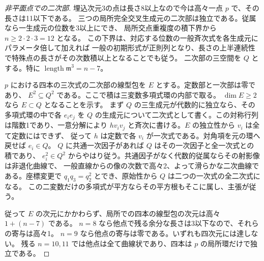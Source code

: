 \begin{proof}[非平面点での二次部]
埋込次元3の点は長さ8以上なので今は高々一点 $p$ で、その長さは11以下である。
三つの局所完全交叉生成元の二次部は独立である。従属なら一生成元の位数を3以上にでき、
局所交点重複度の積下界から $n\ge2\cdot2\cdot3=12$ となる。
この下界は、対応する位数の一般斉次式を各生成元にパラメータ倍して加えれば
一般の初期形式が正則列となり、長さの上半連続性で特殊点の長さがその次数積以上となることでも従う。
二次部の三空間を $Q$ とする。特に $\operatorname{length}\mathfrak m^3=n-7$。

$p$ における四本の三次式の二次部の線型包を $E$ とする。定数部と一次部は零であり、
$E^2\subseteq Q^2$ である。ここで積は三変数多項式環の内部で取る。
$\dim E\ge2$ なら $E\subset Q$ となることを示す。
まず $Q$ の三生成元が代数的に独立なら、その多項式環の中で各 $e_i e_j$ を
$Q$ の生成元について二次式として書く。この対称行列は階数1であり、一意分解により
$h v_i v_j$ と斉次に書ける。$E$ の独立性から $v_i$ は全て定数にはできず、
従って $h$ は定数で各 $v_i$ が一次式である。対角項を元の環へ戻せば $e_i\in Q$。
$Q$ に共通一次因子があれば $Q$ はその一次因子と全一次式との積であり、
$e_i^2\in Q^2$ からやはり従う。共通因子がなく代数的従属ならその射影像は非退化曲線で、
一般直線からの像の次数で高々2、よって滑らかな二次曲線である。座標変更で
$q_1q_3=q_2^2$ とでき、原始性から $Q$ は二つの一次式の全二次式になる。
この二変数だけの多項式が平方ならその平方根もそこに属し、主張が従う。

従って $E$ の次元にかかわらず、局所での四本の線型包の次元は高々 $1+(n-7)$ である。
$n=8$ なら他点で残る余分な長さは3以下なので、それらの寄与は高々1。
$n=9$ なら他点の寄与は零である。いずれも四次元には達しない。
残る $n=10,11$ では他点は全て曲線状であり、四本は $p$ の局所環だけで独立である。
\end{proof}


